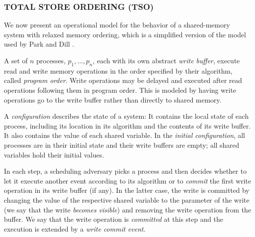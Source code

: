 \subsubsection*{TOTAL STORE ORDERING (TSO)}
We now present an operational model for the behavior of a shared-memory system with relaxed memory ordering, which is a simplified version of the model used by Park and Dill \cite{DBLP:journals/tc/ParkD99}.

A set of $n$ processes, $p_1,\ldots, p_n$, each with its own abstract \emph{write buffer}, execute read and write memory operations in the order specified by their algorithm, called \emph{program order}. Write operations may be delayed and executed after read operations following them in program order. This is modeled by having write operations go to the write buffer rather than directly to shared memory.

A \emph{configuration} describes the state of a system: It contains the local state of each process, including its location in its algorithm and the contents of its write buffer. It also contains the value of each shared variable. In the \emph{initial configuration}, all processes are in their initial state and their write buffers are empty; all shared variables hold their initial values.

In each step, a scheduling adversary picks a process and then decides whether to let it execute another event
according to its algorithm or to \emph{commit} the first write operation in its write buffer (if any).
In the latter case, the write is committed by changing the value of the respective shared variable to the parameter
of the write (we say that the write \emph{becomes visible}) and removing the write operation from the buffer.
We say that the write operation is \emph{committed} at this step and the execution is extended by a \emph{write commit event}.

